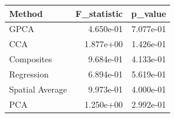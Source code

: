\begin{tabular}{lrr}
\toprule
Method & F_statistic & p_value \\
\midrule
GPCA & 4.650e-01 & 7.077e-01 \\
CCA & 1.877e+00 & 1.426e-01 \\
Composites & 9.684e-01 & 4.133e-01 \\
Regression & 6.894e-01 & 5.619e-01 \\
Spatial Average & 9.973e-01 & 4.000e-01 \\
PCA & 1.250e+00 & 2.992e-01 \\
\bottomrule
\end{tabular}
